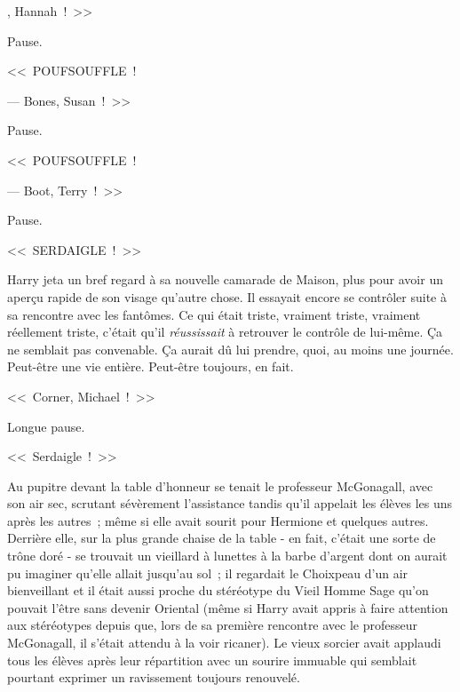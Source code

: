 
, Hannah~!~>>

\hplettrineextrapara
Pause.

<<~POUFSOUFFLE~!

--- Bones, Susan~!~>>

Pause.

<<~POUFSOUFFLE~!

--- Boot, Terry~!~>>

Pause.

<<~SERDAIGLE~!~>>

Harry jeta un bref regard à sa nouvelle camarade de Maison, plus pour avoir un aperçu rapide de son visage qu'autre chose. Il essayait encore se contrôler suite à sa rencontre avec les fantômes. Ce qui était triste, vraiment triste, vraiment réellement triste, c'était qu'il \emph{réussissait} à retrouver le contrôle de lui-même. Ça ne semblait pas convenable. Ça aurait dû lui prendre, quoi, au moins une journée. Peut-être une vie entière. Peut-être toujours, en fait.

<<~Corner, Michael~!~>>

Longue pause.

<<~Serdaigle~!~>>

Au pupitre devant la table d'honneur se tenait le professeur McGonagall, avec son air sec, scrutant sévèrement l'assistance tandis qu'il appelait les élèves les uns après les autres~; même si elle avait sourit pour Hermione et quelques autres. Derrière elle, sur la plus grande chaise de la table - en fait, c'était une sorte de trône doré - se trouvait un vieillard à lunettes à la barbe d'argent dont on aurait pu imaginer qu'elle allait jusqu'au sol~; il regardait le Choixpeau d'un air bienveillant et il était aussi proche du stéréotype du Vieil Homme Sage qu'on pouvait l'être sans devenir Oriental (même si Harry avait appris à faire attention aux stéréotypes depuis que, lors de sa première rencontre avec le professeur McGonagall, il s'était attendu à la voir ricaner). Le vieux sorcier avait applaudi tous les élèves après leur répartition avec un sourire immuable qui semblait pourtant exprimer un ravissement toujours renouvelé.

